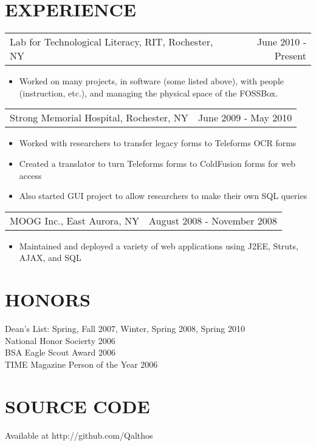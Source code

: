 \documentclass[margin]{res}
\begin{document}
\begin{resume}
\section{EXPERIENCE}
    \begin{tabular}{p{3.5in} r} %
        Lab for Technological Literacy, RIT, Rochester, NY & June 2010 - Present
    \end{tabular}
        \begin{itemize} %
            \item[] Worked on many projects, in software (some listed above),
                with people (instruction, etc.), and managing the physical
                space of the FOSSBox.
        \end{itemize}
    \begin{tabular}{p{3.5in} r}
        Strong Memorial Hospital, Rochester, NY & June 2009 - May 2010
    \end{tabular}
    \begin{itemize}
        \item[] Worked with researchers to transfer legacy forms to Teleforms OCR forms
        \item[] Created a translator to turn Teleforms forms to ColdFusion forms for web access
        \item[] Also started GUI project to allow researchers to make their own SQL queries
    \end{itemize}
    \begin{tabular}{p{3.5in} r} %
        MOOG Inc., East Aurora, NY & August 2008 - November 2008
    \end{tabular}
    \begin{itemize}
        \item[] Maintained and deployed a variety of web applications using J2EE, Struts, AJAX, and SQL
    \end{itemize}

\section{HONORS} Dean's List: Spring, Fall 2007, Winter, Spring 2008, Spring 2010 \\
                 National Honor Socierty 2006 \\
                 BSA Eagle Scout Award 2006 \\
                 TIME Magazine Person of the Year 2006 \\

\section{SOURCE CODE} Available at http://github.com/Qalthos \\

\end{resume}
\end{document}
